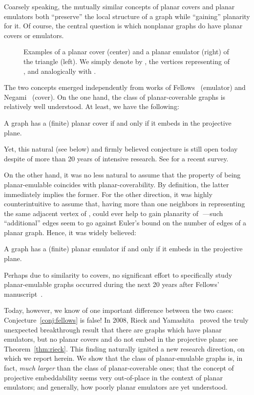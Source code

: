 \documentclass[envcountsect,envcountsame]{llncs}
\begin{document}
Coarsely speaking, the mutually similar concepts of planar covers and planar
emulators both ``preserve'' the local structure of a graph  while ``gaining''
planarity for it. Of course, the central question is which nonplanar graphs do
have planar covers or emulators.

\begin{figure}

\caption{Examples of a planar cover (center) and a planar emulator (right) of the triangle
 (left).
We simply denote by ,  the vertices representing  of
, and analogically with .
}
\label{fig:emulcoverexample}
\end{figure}

The two concepts emerged independently from works of
Fellows~\cite{cit:fellows,cit:femul} (emulator) and 
Negami~\cite{cit:double,cit:conjecture,cit:negsinica} (cover).
On the one hand, the class of planar-coverable graphs is relatively well
understood. At least, we have the following:

\begin{conj}
\label{conj:negami}
A graph has a (finite) planar cover if and only if it embeds in the projective plane.
\end{conj}
Yet, this natural (see below) and firmly believed conjecture is still open today
despite of more than 20 years of intensive research.
See \cite{cit:20years} for a recent survey.

On the other hand, 
it was no less natural to assume \cite{cit:fellows,cit:femul} that
the property of being planar-emulable coincides with 
planar-coverability. By definition, the latter immediately implies the former.
For the other direction, it was highly counterintuitive
to assume that, having more than one neighbors in  representing the same
adjacent vertex of ,
could ever help to gain planarity of~\,---such ``additional'' 
edges seem to go against Euler's bound on the number of edges of a planar graph.
Hence, it was widely believed:

\begin{conj}
\label{conj:fellows}
A graph has a (finite) planar emulator if and only if it embeds in the projective plane.
\end{conj}
Perhaps due to similarity to covers, no significant effort to
specifically study planar-emulable graphs occurred during the next 20 years after Fellows' manuscript~\cite{cit:femul}.

Today, however, we know of one important difference between the two
cases: Conjecture~\ref{conj:fellows} is false!
In 2008, Rieck and Yamashita~\cite{cit:rieck} proved
the truly unexpected breakthrough result that there are graphs which have 
planar emulators, but no planar covers and do not embed in the projective plane;
see Theorem~\ref{thm:rieck}.
This finding naturally ignited a new research direction, on which we report
herein. 
We show that the class of planar-emulable graphs is, in fact, 
\emph{much larger} than the class of planar-coverable ones; that the concept of
projective embeddability seems very out-of-place in the context of planar
emulators; and generally, how poorly planar emulators are yet understood.
\end{document}
